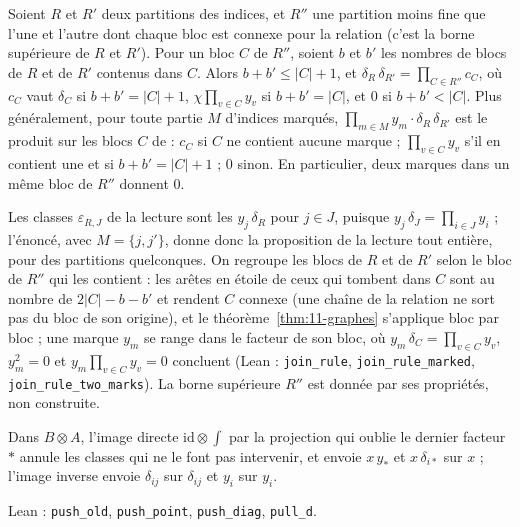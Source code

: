 \begin{enonce}
Soient $R$ et $R'$ deux partitions des indices, et $R''$ une partition moins fine que l'une et l'autre dont chaque bloc est connexe pour la relation  (c'est la borne supérieure de $R$ et $R'$). Pour un bloc $C$ de $R''$, soient $b$ et $b'$ les nombres de blocs de $R$ et de $R'$ contenus dans $C$. Alors $b + b' \leqslant |C| + 1$, et $\delta_R\,\delta_{R'} = \prod_{C \in R''} c_C$, où $c_C$ vaut $\delta_C$ si $b + b' = |C| + 1$, $\chi \prod_{v \in C} y_v$ si $b + b' = |C|$, et $0$ si $b + b' < |C|$. Plus généralement, pour toute partie $M$ d'indices marqués, $\prod_{m \in M} y_m \cdot \delta_R\,\delta_{R'}$ est le produit sur les blocs $C$ de : $c_C$ si $C$ ne contient aucune marque ; $\prod_{v \in C} y_v$ s'il en contient une et si $b + b' = |C| + 1$ ; $0$ sinon. En particulier, deux marques dans un même bloc de $R''$ donnent $0$.
\end{enonce}

Les classes $\varepsilon_{R,J}$ de la lecture sont les $y_j\,\delta_R$ pour $j \in J$, puisque $y_j\,\delta_J = \prod_{i \in J} y_i$ ; l'énoncé, avec $M = \{j, j'\}$, donne donc la proposition de la lecture tout entière, pour des partitions quelconques. On regroupe les blocs de $R$ et de $R'$ selon le bloc de $R''$ qui les contient : les arêtes en étoile de ceux qui tombent dans $C$ sont au nombre de $2|C| - b - b'$ et rendent $C$ connexe (une chaîne de la relation ne sort pas du bloc de son origine), et le théorème~\ref{thm:11-graphes} s'applique bloc par bloc ; une marque $y_m$ se range dans le facteur de son bloc, où $y_m\,\delta_C = \prod_{v \in C} y_v$, $y_m^2 = 0$ et $y_m \prod_{v \in C} y_v = 0$ concluent (Lean : \texttt{join\_rule}, \texttt{join\_rule\_marked}, \texttt{join\_rule\_two\_marks}). La borne supérieure $R''$ est donnée par ses propriétés, non construite.

\begin{enonce}
Dans $B \otimes A$, l'image directe $\mathrm{id} \otimes \int$ par la projection qui oublie le dernier facteur $\ast$ annule les classes qui ne le font pas intervenir, et envoie $x\,y_\ast$ et $x\,\delta_{i\ast}$ sur $x$ ; l'image inverse envoie $\delta_{ij}$ sur $\delta_{ij}$ et $y_i$ sur $y_i$.
\end{enonce}

Lean : \texttt{push\_old}, \texttt{push\_point}, \texttt{push\_diag}, \texttt{pull\_d}.

